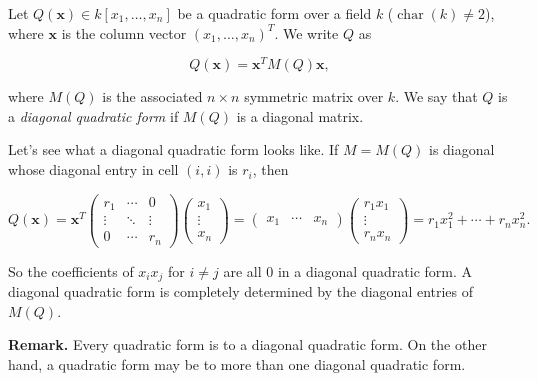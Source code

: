 \documentclass[12pt]{article}
\begin{document}
Let $Q(\boldsymbol{x})\in k[x_1,\ldots,x_n]$ be a quadratic form over a field $k$ ($\operatorname{char}(k)\neq 2$), where $\boldsymbol{x}$ is the column vector $(x_1,\ldots,x_n)^T$.  We write $Q$ as 

$$Q(\boldsymbol{x})=\boldsymbol{x}^TM(Q)\boldsymbol{x},$$

where $M(Q)$ is the associated $n\times n$ symmetric matrix over $k$.  We say that $Q$ is a \emph{diagonal quadratic form} if $M(Q)$ is a diagonal matrix.

Let's see what a diagonal quadratic form looks like.  If $M=M(Q)$ is diagonal whose diagonal entry in cell $(i,i)$ is $r_i$, then 

\begin{center}$
Q(\boldsymbol{x})=\boldsymbol{x}^T
\begin{pmatrix}r_1 & \cdots & 0 \\
\vdots & \ddots & \vdots \\
0 & \cdots & r_n\end{pmatrix}
\begin{pmatrix}x_1 \\
\vdots \\ x_n\end{pmatrix}
=\begin{pmatrix}x_1 & \cdots & x_n\end{pmatrix}
\begin{pmatrix}r_1x_1 \\ \vdots \\ r_nx_n\end{pmatrix}
=r_1x_1^2+\cdots+r_nx_n^2.
$\end{center}

So the coefficients of $x_ix_j$ for $i\neq j$ are all $0$ in a diagonal quadratic form.  A diagonal quadratic form is completely determined by the diagonal entries of $M(Q)$.

\textbf{Remark.} Every quadratic form is  to a diagonal quadratic form.  On the other hand, a quadratic form may be  to more than one diagonal quadratic form.
\end{document}
